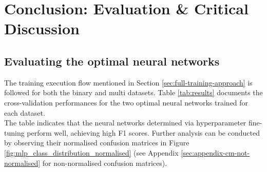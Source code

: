 \documentclass[letterpaper,12pt]{article}
\begin{document}

\section{Conclusion: Evaluation \& Critical Discussion}
\label{sec:evaluation}

\subsection{Evaluating the optimal neural networks}

The training execution flow mentioned in Section \ref{sec:full-training-approach} is followed for both the binary and multi datasets. Table \ref{tab:results} documents the cross-validation performances for the two optimal neural networks trained for each dataset.\\



The table indicates that the neural networks determined via hyperparameter fine-tuning perform well, achieving high F1 scores. Further analysis can be conducted by observing their normalised confusion matrices in Figure \ref{fig:mlp_class_distribution_normalised} (see Appendix \ref{sec:appendix-cm-not-normalised} for non-normalised confusion matrices).\\
\end{document}
